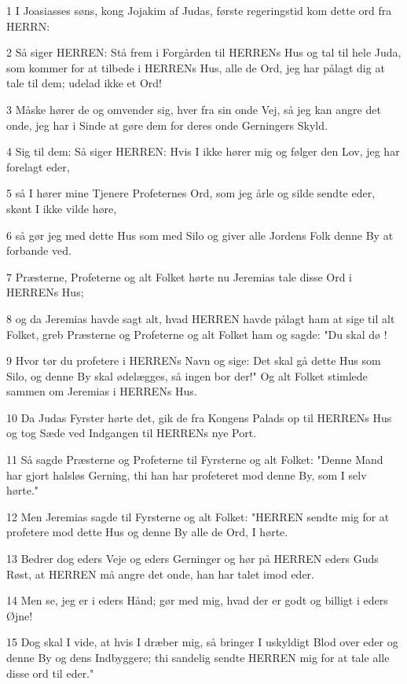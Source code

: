 \par 1 I Joasiasses søns, kong Jojakim af Judas, første regeringstid kom dette ord fra HERRN:
\par 2 Så siger HERREN: Stå frem i Forgården til HERRENs Hus og tal til hele Juda, som kommer for at tilbede i HERRENs Hus, alle de Ord, jeg har pålagt dig at tale til dem; udelad ikke et Ord!
\par 3 Måske hører de og omvender sig, hver fra sin onde Vej, så jeg kan angre det onde, jeg har i Sinde at gøre dem for deres onde Gerningers Skyld.
\par 4 Sig til dem: Så siger HERREN: Hvis I ikke hører mig og følger den Lov, jeg har forelagt eder,
\par 5 så I hører mine Tjenere Profeternes Ord, som jeg årle og silde sendte eder, skønt I ikke vilde høre,
\par 6 så gør jeg med dette Hus som med Silo og giver alle Jordens Folk denne By at forbande ved.
\par 7 Præsterne, Profeterne og alt Folket hørte nu Jeremias tale disse Ord i HERRENs Hus;
\par 8 og da Jeremias havde sagt alt, hvad HERREN havde pålagt ham at sige til alt Folket, greb Præsterne og Profeterne og alt Folket ham og sagde: "Du skal dø !
\par 9 Hvor tør du profetere i HERRENs Navn og sige: Det skal gå dette Hus som Silo, og denne By skal ødelægges, så ingen bor der!" Og alt Folket stimlede sammen om Jeremias i HERRENs Hus.
\par 10 Da Judas Fyrster hørte det, gik de fra Kongens Palads op til HERRENs Hus og tog Sæde ved Indgangen til HERRENs nye Port.
\par 11 Så sagde Præsterne og Profeterne til Fyrsterne og alt Folket: "Denne Mand har gjort halsløs Gerning, thi han har profeteret mod denne By, som I selv hørte."
\par 12 Men Jeremias sagde til Fyrsterne og alt Folket: "HERREN sendte mig for at profetere mod dette Hus og denne By alle de Ord, I hørte.
\par 13 Bedrer dog eders Veje og eders Gerninger og hør på HERREN eders Guds Røst, at HERREN må angre det onde, han har talet imod eder.
\par 14 Men se, jeg er i eders Hånd; gør med mig, hvad der er godt og billigt i eders Øjne!
\par 15 Dog skal I vide, at hvis I dræber mig, så bringer I uskyldigt Blod over eder og denne By og dens Indbyggere; thi sandelig sendte HERREN mig for at tale alle disse ord til eder."
